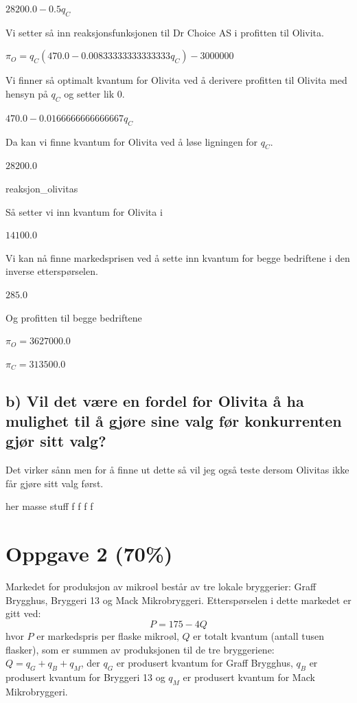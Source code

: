 \documentclass[
  12pt,
  a4paper,
  DIV=11,
  numbers=noendperiod]{scrartcl}
\begin{document}
$\displaystyle 28200.0 - 0.5 q_{C}$

Vi setter så inn reaksjonsfunksjonen til Dr Choice AS i profitten til
Olivita.

$\displaystyle π_{O} = q_{C} \left(470.0 - 0.00833333333333333 q_{C}\right) - 3000000$

Vi finner så optimalt kvantum for Olivita ved å derivere profitten til
Olivita med hensyn på \(q_C\) og setter lik 0.

$\displaystyle 470.0 - 0.0166666666666667 q_{C}$

Da kan vi finne kvantum for Olivita ved å løse ligningen for \(q_C\).

$\displaystyle 28200.0$

reaksjon\_olivitas

Så setter vi inn kvantum for Olivita i

$\displaystyle 14100.0$

Vi kan nå finne markedsprisen ved å sette inn kvantum for begge
bedriftene i den inverse etterspørselen.

$\displaystyle 285.0$

Og profitten til begge bedriftene

$\displaystyle π_{O} = 3627000.0$

$\displaystyle π_{C} = 313500.0$

\subsection{b) Vil det være en fordel for Olivita å ha mulighet til å
gjøre sine valg før konkurrenten gjør sitt
valg?}\label{b-vil-det-vuxe6re-en-fordel-for-olivita-uxe5-ha-mulighet-til-uxe5-gjuxf8re-sine-valg-fuxf8r-konkurrenten-gjuxf8r-sitt-valg}

Det virker sånn men for å finne ut dette så vil jeg også teste dersom
Olivitas ikke får gjøre sitt valg først.

her masse stuff f f f f

\clearpage

\section{Oppgave 2 (70\%)}\label{oppgave-2-70}

Markedet for produksjon av mikroøl består av tre lokale bryggerier:
Graff Brygghus, Bryggeri 13 og Mack Mikrobryggeri. Etterspørselen i
dette markedet er gitt ved: \[
P = 175-4Q
\] hvor \(P\) er markedspris per flaske mikroøl, \(Q\) er totalt kvantum
(antall tusen flasker), som er summen av produksjonen til de tre
bryggeriene: \(Q = q_G + q_B + q_M\), der \(q_G\) er produsert kvantum
for Graff Brygghus, \(q_B\) er produsert kvantum for Bryggeri 13 og
\(q_M\) er produsert kvantum for Mack Mikrobryggeri.
\end{document}
